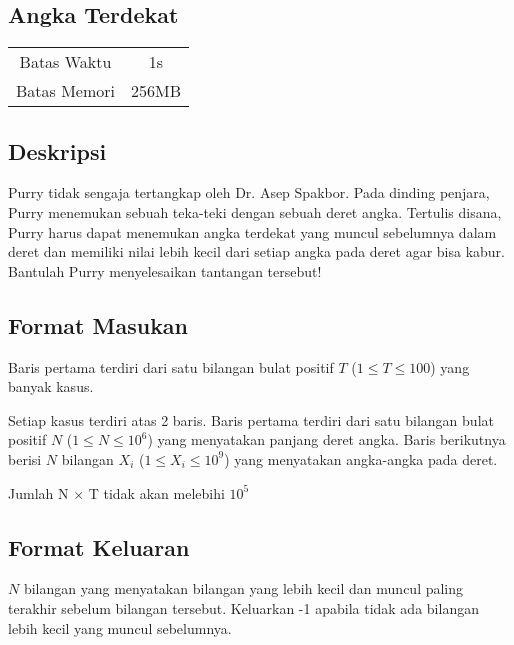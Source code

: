 \documentclass{article}
\begin{document}
\begin{center}

    
    \section*{Angka Terdekat} %

    \begin{tabular}{ | c c | }
        \hline
        Batas Waktu  & 1s \\    %
        Batas Memori & 256MB \\  %
        \hline
    \end{tabular}
\end{center}

\subsection*{Deskripsi}

Purry tidak sengaja tertangkap oleh Dr. Asep Spakbor. Pada dinding penjara, Purry menemukan sebuah teka-teki dengan sebuah deret angka. Tertulis disana, Purry harus dapat menemukan angka terdekat yang muncul sebelumnya dalam deret dan memiliki nilai lebih kecil dari setiap angka pada deret agar bisa kabur. Bantulah Purry menyelesaikan tantangan tersebut!

\subsection*{Format Masukan}

Baris pertama terdiri dari satu bilangan bulat positif $T$ ($1 \leq T \leq 100$)  yang banyak kasus.

Setiap kasus terdiri atas 2 baris. Baris pertama terdiri dari satu bilangan bulat positif $N$ ($1 \leq N \leq 10^{6}$)  yang menyatakan panjang deret angka.
Baris berikutnya berisi $N$ bilangan $X_i$ ($1 \leq X_i \leq 10^{9}$) yang menyatakan angka-angka pada deret.

Jumlah N $\times$ T tidak akan melebihi $10^5$

\subsection*{Format Keluaran}

$N$ bilangan yang menyatakan bilangan yang lebih kecil dan muncul paling terakhir sebelum bilangan tersebut. Keluarkan -1 apabila tidak ada bilangan lebih kecil yang muncul sebelumnya.
\end{document}
